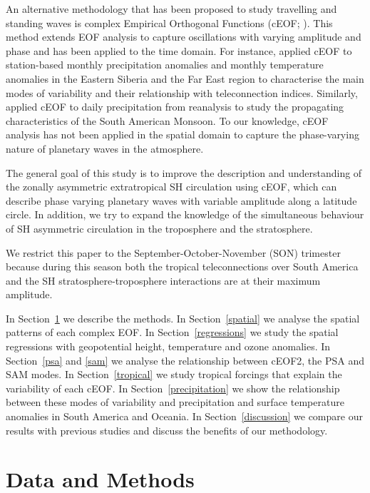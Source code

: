 \documentclass[pdflatex,sn-basic]{sn-jnl}
\theoremstyle{thmstyleone}%
\theoremstyle{thmstyletwo}%
\theoremstyle{thmstylethree}%
\begin{document}
An alternative methodology that has been proposed to study travelling and standing waves is complex Empirical Orthogonal Functions (cEOF; \citet{horel1984}).
This method extends EOF analysis to capture oscillations with varying amplitude and phase and has been applied to the time domain.
For instance, \citet{krokhin2007} applied cEOF to station-based monthly precipitation anomalies and monthly temperature anomalies in the Eastern Siberia and the Far East region to characterise the main modes of variability and their relationship with teleconnection indices.
Similarly, \citet{gelbrecht2018} applied cEOF to daily precipitation from reanalysis to study the propagating characteristics of the South American Monsoon.
To our knowledge, cEOF analysis has not been applied in the spatial domain to capture the phase-varying nature of planetary waves in the atmosphere.

The general goal of this study is to improve the description and understanding of the zonally asymmetric extratropical SH circulation using cEOF, which can describe phase varying planetary waves with variable amplitude along a latitude circle.
In addition, we try to expand the knowledge of the simultaneous behaviour of SH asymmetric circulation in the troposphere and the stratosphere.

We restrict this paper to the September-October-November (SON) trimester because during this season both the tropical teleconnections over South America \citep{cazes-boezio2003} and the SH stratosphere-troposphere interactions \citep{lim2018} are at their maximum amplitude.

In Section~\ref{methods} we describe the methods.
In Section~\ref{spatial} we analyse the spatial patterns of each complex EOF.
In Section~\ref{regressions} we study the spatial regressions with geopotential height, temperature and ozone anomalies.
In Section~\ref{psa} and \ref{sam} we analyse the relationship between cEOF2, the PSA and SAM modes.
In Section~\ref{tropical} we study tropical forcings that explain the variability of each cEOF.
In Section~\ref{precipitation} we show the relationship between these modes of variability and precipitation and surface temperature anomalies in South America and Oceania.
In Section~\ref{discussion} we compare our results with previous studies and discuss the benefits of our methodology.

\hypertarget{methods}{%
\section{Data and Methods}\label{methods}}
\end{document}
